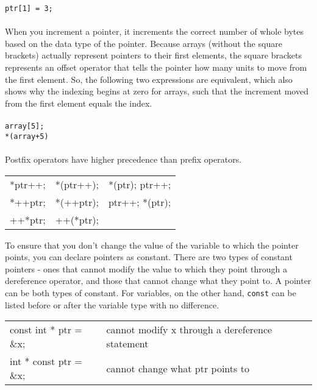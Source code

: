 \documentclass[10pt]{article}
\begin{document}
\color{red}\texttt{ptr[1] = 3;}\color{black}\\
\\
When you increment a pointer, it increments the correct number of whole bytes based on the data type of the pointer. Because arrays (without the square brackets) actually represent pointers to their first elements, the square brackets represents an offset operator that tells the pointer how many units to move from the first element. So, the following two expressions are equivalent, which also shows why the indexing begins at zero for arrays, such that the increment moved from the first element equals the index. \\
\\
\color{red}\texttt{array[5];}\color{black}\\
\color{red}\texttt{*(array+5)}\color{black}\\
\\
Postfix operators have higher precedence than prefix operators.

\begin{center}
\begin{tabular}{l l l}
*ptr++; & *(ptr++); & *(ptr); ptr++;\\
*++ptr; & *(++ptr); & ptr++; *(ptr);\\
++*ptr; & ++(*ptr); & \\
\end{tabular}
\end{center}

To ensure that you don't change the value of the variable to which the pointer points, you can declare pointers as constant. There are two types of constant pointers - ones that cannot modify the value to which they point through a dereference operator, and those that cannot change what they point to. A pointer can be both types of constant. For variables, on the other hand, \texttt{const} can be listed before or after the variable type with no difference.

\begin{center}
\begin{tabular}{l l}
const int * ptr = \&x; & cannot modify x through a dereference statement\\
int * const ptr = \&x; & cannot change what ptr points to\\
\end{tabular}
\end{center}
\end{document}
